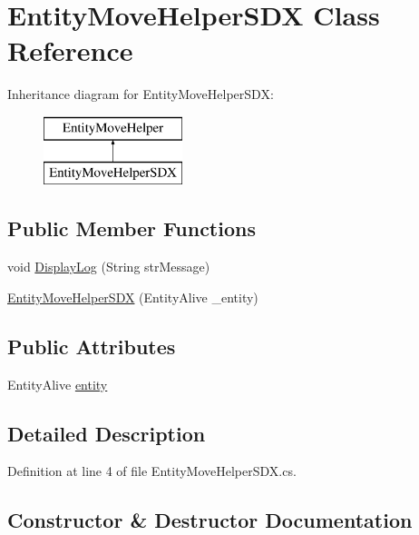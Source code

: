 \hypertarget{class_entity_move_helper_s_d_x}{}\section{Entity\+Move\+Helper\+S\+DX Class Reference}
\label{class_entity_move_helper_s_d_x}
Inheritance diagram for Entity\+Move\+Helper\+S\+DX\+:\begin{figure}[H]
\begin{center}
\leavevmode
\includegraphics[height=2.000000cm]{class_entity_move_helper_s_d_x}
\end{center}
\end{figure}
\subsection*{Public Member Functions}
\begin{DoxyCompactItemize}
\item 
void \mbox{\hyperlink{class_entity_move_helper_s_d_x_a20b0833864e405fc378bef2a7b08e42d}{Display\+Log}} (String str\+Message)
\item 
\mbox{\hyperlink{class_entity_move_helper_s_d_x_abdee63a7d4819be5e8876e8e72d3edd8}{Entity\+Move\+Helper\+S\+DX}} (Entity\+Alive \+\_\+entity)
\end{DoxyCompactItemize}
\subsection*{Public Attributes}
\begin{DoxyCompactItemize}
\item 
Entity\+Alive \mbox{\hyperlink{class_entity_move_helper_s_d_x_a21c1914c566ca9a9ef40aca19ecddac0}{entity}}
\end{DoxyCompactItemize}


\subsection{Detailed Description}


Definition at line 4 of file Entity\+Move\+Helper\+S\+D\+X.\+cs.



\subsection{Constructor \& Destructor Documentation}
\mbox{\label{class_entity_move_helper_s_d_x_abdee63a7d4819be5e8876e8e72d3edd8}} 

